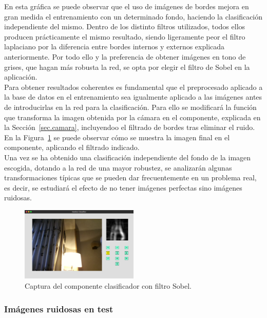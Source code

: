 En esta gráfica se puede observar que el uso de imágenes de bordes mejora en gran medida el entrenamiento con un determinado fondo, haciendo la clasificación independiente del mismo. Dentro de los distinto filtros utilizados, todos ellos producen prácticamente el mismo resultado, siendo ligeramente peor el filtro laplaciano por la diferencia entre bordes internos y externos explicada anteriormente. Por todo ello y la preferencia de obtener imágenes en tono de grises, que hagan más robusta la red, se opta por elegir el filtro de Sobel en la aplicación.\\

Para obtener resultados coherentes es fundamental que el preprocesado aplicado a la base de datos en el entrenamiento sea igualmente aplicado a las imágenes antes de introducirlas en la red para la clasificación. Para ello se modificará la función que transforma la imagen obtenida por la cámara en el componente, explicada en la Sección~\ref{sec.camara}, incluyendoo el filtrado de bordes tras eliminar el ruido. En la Figura~\ref{fig.componente2} se puede observar cómo se muestra la imagen final en el componente, aplicando el filtrado indicado.\\

Una vez se ha obtenido una clasificación independiente del fondo de la imagen escogida, dotando a la red de una mayor robustez, se analizarán algunas transformaciones típicas que se pueden dar frecuentemente en un problema real, es decir, se estudiará el efecto de no tener imágenes perfectas sino imágenes ruidosas.

\begin{figure}[H]
	\begin{center}
		\includegraphics[width=0.5\textwidth]{figures/componente2}
		\caption{Captura del componente clasificador con filtro Sobel.}
		\label{fig.componente2}
	\end{center}
\end{figure}

\subsubsection{Imágenes ruidosas en test}

